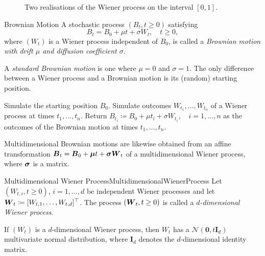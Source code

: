 \begin{figure}[H]
	\centering
	
	\caption{Two realisations of the Wiener process on the interval $[0,1]$.}
	\label{fig:twoRealisations.pgf}
\end{figure}

\begin{defn}{Brownian Motion}{}
	A stochastic process $(B_t, t \ge 0)$ satisfying
	\begin{equation*}
		B_t = B_0 + \mu t + \sigma W_t, \quad t \ge 0,
	\end{equation*}
	where $(W_t)$ is a Wiener process independent of $B_0$, is called a \textit{Brownian motion with drift $\mu$ and diffusion coefficient $\sigma$}.
\end{defn}

A \textit{standard Brownian motion} is one where $\mu = 0$ and $\sigma = 1$. The only difference between a Wiener process and a Brownian motion is its (random) starting position.

\begin{algorithm}[H]
	\caption{Simulating a Brownian Motion}
	\label{alg:SimulatingBrownianMotion}
	\begin{algorithmic}[1]
		\State Simulate the starting position $B_0$.
		\State Simulate outcomes $W_{t_1}, \dots, W_{t_n}$ of a Wiener process at times $t_1, \dots, t_n$.
		\State Return $B_{t_i} \coloneqq B_0 + \mu t_i + \sigma W_{t_i}, \quad i = 1, \dots, n$ as the outcomes of the Brownian motion at times $t_1, \dots, t_n$.
	\end{algorithmic}
\end{algorithm}

Multidimensional Brownian motions are likewise obtained from an affine transformation $\boldsymbol{B}_t = \boldsymbol{B}_0 + \boldsymbol{\mu} t + \boldsymbol{\sigma} \boldsymbol{W}_t$ of a multidimensional Wiener process, where $\boldsymbol{\sigma}$ is a matrix.

\begin{defn}{Multidimensional Wiener Process}{MultidimensionalWienerProcess}
	Let $(W_{t,i}, t \ge 0)$, $i = 1, \dots, d$ be independent Wiener processes and let $\boldsymbol{W}_t \coloneqq [W_{t,1}, \dots, W_{t,d}]^{\top}$. The process $(\boldsymbol{W}_t, t \ge 0)$ is called a \textit{$d$-dimensional Wiener process}.
\end{defn}

If $(W_t)$ is a $d$-dimensional Wiener process, then $W_t$ has a $\mathcal{N}(\mathbf{0}, t \mathbf{I}_d)$ multivariate normal distribution, where $\mathbf{I}_d$ denotes the $d$-dimensional identity matrix.

